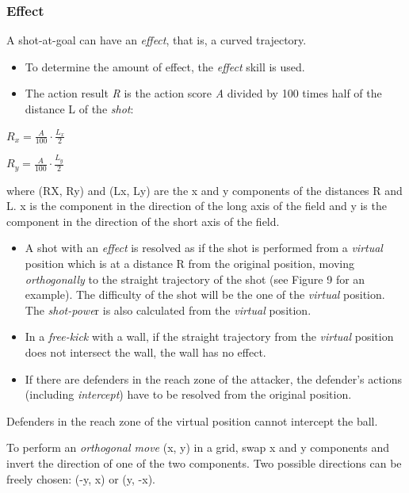 \documentclass[12pt]{article}
\begin{document}
\subsubsection{Effect}
A shot-at-goal can have an \emph{effect}, that is, a curved trajectory.

\begin{rulebox}
\begin{itemize}
\item To determine the amount of effect, the \emph{effect }skill is used.
\item The action result \emph{R} is the action score \emph{A} divided by 100 times half of the distance L of the \emph{shot}:
\end{itemize}

\begin{formulabox}
$R_x = \frac{A}{100} \cdot \frac{L_x}{2}$

$R_y = \frac{A}{100} \cdot \frac{L_y}{2}$
\end{formulabox}

where (RX, Ry) and (Lx, Ly) are the x and y components of the distances R and L. x is the component in the direction of the long axis of the field and y is the component in the direction of the short axis of the field.

\begin{itemize}
\item A shot with an \emph{effect }is resolved as if the shot is performed from a \emph{virtual }position which is at a distance R from the original position, moving \emph{orthogonally }to the straight trajectory of the shot (see Figure 9 for an example). The difficulty of the shot will be the one of the \emph{virtual }position. The \emph{shot-powe}r is also calculated from the \emph{virtual }position.
\item In a \emph{free-kick} with a wall, if the straight trajectory from the \emph{virtual }position does not intersect the wall, the wall has no effect.
\item If there are defenders in the reach zone of the attacker, the defender's actions (including \emph{intercept}) have to be resolved from the original position.
\end{itemize}
\end{rulebox}

\begin{note}
Defenders in the reach zone of the virtual position cannot intercept the ball.
\end{note}

\begin{hint}
To perform an \emph{orthogonal move} (x, y) in a grid, swap x and y components and invert the direction of one of the two components. Two possible directions can be freely chosen: (-y, x) or (y, -x).
\end{hint}
\end{document}
